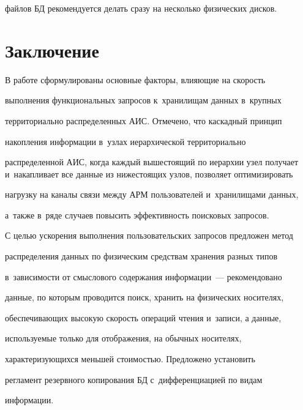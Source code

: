 файлов БД рекомендуется делать сразу на несколько физических дисков.





\section{Заключение}





  В работе сформулированы основные факторы, влияющие на скорость 


выполнения функциональных запросов к~хранилищам данных в~крупных 


территориально распределенных АИС. Отмечено, что каскадный принцип 


накопления информации в~узлах иерархической территориально 


распределенной АИС, когда каждый вышестоящий по иерархии узел получает и~накапливает все данные из нижестоящих узлов, позволяет оптимизировать 


нагрузку на каналы связи между АРМ пользователей и~хранилищами данных, 


а~также в~ряде случаев повысить эффективность поисковых запросов.


  


  С целью ускорения выполнения пользовательских запросов предложен метод 


распределения данных по физическим средствам хранения разных типов 


в~зависимости от смыслового содержания информации~--- рекомендовано 


данные, по которым проводится поиск, хранить на физических носителях, 


обеспечивающих высокую скорость операций чтения и~записи, а данные, 


используемые только для отображения, на обычных носителях, 


характеризующихся меньшей сто\-и\-мостью. Предложено установить 


регламент резервного копирования БД с~дифференциацией по видам 


информации.


  



